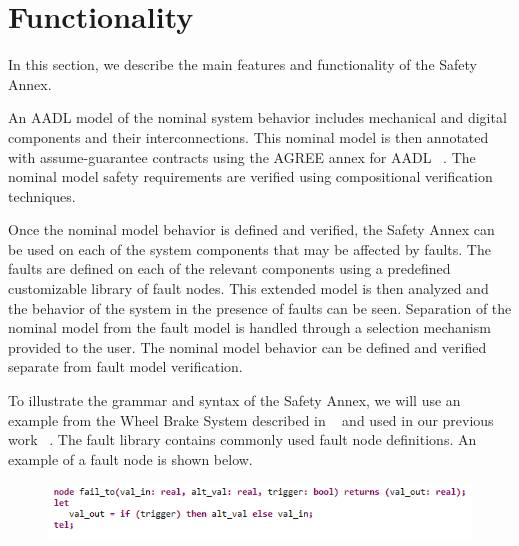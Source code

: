 \section{Functionality}
In this section, we describe the main features and functionality of the Safety Annex. 

An AADL model of the nominal system behavior includes mechanical and digital components and their interconnections. This nominal model is then annotated with assume-guarantee contracts using the AGREE annex for AADL ~\cite{NFM2012:CoGaMiWhLaLu}. The nominal model safety requirements are verified using compositional verification techniques. 

Once the nominal model behavior is defined and verified, the Safety Annex can be used on each of the system components that may be affected by faults. The faults are defined on each of the relevant components using a predefined customizable library of fault nodes. This extended model is then analyzed and the behavior of the system in the presence of faults can be seen. Separation of the nominal model from the fault model is handled through a selection mechanism provided to the user. The nominal model behavior can be defined and verified separate from fault model verification. 

To illustrate the grammar and syntax of the Safety Annex, we will use an example from the Wheel Brake System described in ~\cite{AIR6110} and used in our previous work ~\cite{Stewart17:IMBSA}. 
The fault library contains commonly used fault node definitions. An example of a fault node is shown below. 
\begin{figure}[h!]
\vspace{-0.19in}
\begin{center}
\includegraphics[trim=0 9 0 5,clip,width=1.0\textwidth]{images/faultNode.png}
\end{center}
\vspace{-0.4in}
\end{figure}

